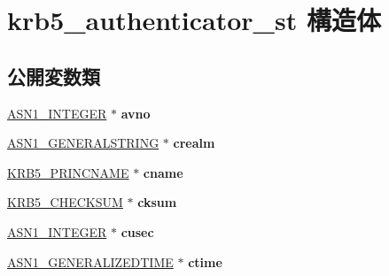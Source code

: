 \hypertarget{structkrb5__authenticator__st}{}\section{krb5\+\_\+authenticator\+\_\+st 構造体}
\label{structkrb5__authenticator__st}
\subsection*{公開変数類}
\begin{DoxyCompactItemize}
\item 
\hypertarget{structkrb5__authenticator__st_a9ed01e68c50931dd9d7ab5bc02c1201d}{}\hyperlink{structasn1__string__st}{A\+S\+N1\+\_\+\+I\+N\+T\+E\+G\+E\+R} $\ast$ {\bfseries avno}\label{structkrb5__authenticator__st_a9ed01e68c50931dd9d7ab5bc02c1201d}

\item 
\hypertarget{structkrb5__authenticator__st_afe6a1007edb042a4152f9f7c81576568}{}\hyperlink{structasn1__string__st}{A\+S\+N1\+\_\+\+G\+E\+N\+E\+R\+A\+L\+S\+T\+R\+I\+N\+G} $\ast$ {\bfseries crealm}\label{structkrb5__authenticator__st_afe6a1007edb042a4152f9f7c81576568}

\item 
\hypertarget{structkrb5__authenticator__st_a97834129a3f43febc53ebd5335de32b7}{}\hyperlink{structkrb5__princname__st}{K\+R\+B5\+\_\+\+P\+R\+I\+N\+C\+N\+A\+M\+E} $\ast$ {\bfseries cname}\label{structkrb5__authenticator__st_a97834129a3f43febc53ebd5335de32b7}

\item 
\hypertarget{structkrb5__authenticator__st_ac34bce7526107466b7462957744ddee6}{}\hyperlink{structkrb5__checksum__st}{K\+R\+B5\+\_\+\+C\+H\+E\+C\+K\+S\+U\+M} $\ast$ {\bfseries cksum}\label{structkrb5__authenticator__st_ac34bce7526107466b7462957744ddee6}

\item 
\hypertarget{structkrb5__authenticator__st_a0338e47f6edaf74442f46dc6ad8fbfcb}{}\hyperlink{structasn1__string__st}{A\+S\+N1\+\_\+\+I\+N\+T\+E\+G\+E\+R} $\ast$ {\bfseries cusec}\label{structkrb5__authenticator__st_a0338e47f6edaf74442f46dc6ad8fbfcb}

\item 
\hypertarget{structkrb5__authenticator__st_acdcdd96312d76a5cb2398768e5ed0e69}{}\hyperlink{structasn1__string__st}{A\+S\+N1\+\_\+\+G\+E\+N\+E\+R\+A\+L\+I\+Z\+E\+D\+T\+I\+M\+E} $\ast$ {\bfseries ctime}\label{structkrb5__authenticator__st_acdcdd96312d76a5cb2398768e5ed0e69}


\end{DoxyCompactItemize}

